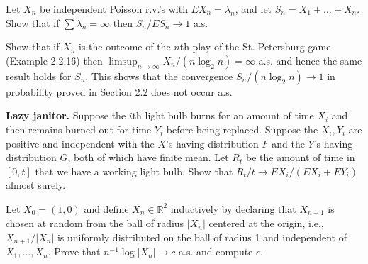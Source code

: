   \begin{exercise}[Durrett 2.3.19]
    Let $X_n$ be independent Poisson r.v.'s with $EX_n = \lambda_n$, and let $S_n = X_1 + \dots + X_n$. Show that if $\sum \lambda_n = \infty$ then $S_n/ES_n \to 1$ a.s.
  \end{exercise}
  \begin{solution}

  \end{solution}

  \begin{exercise}[Durrett 2.3.20]
    Show that if $X_n$ is the outcome of the $n$th play of the St. Petersburg game (Example 2.2.16) then $\limsup_{n \to \infty} X_n / (n \log_2 n) = \infty$ a.s. and hence the same result holds for $S_n$. This shows that the convergence $S_n / (n \log_2 n) \to 1$ in probability proved in Section 2.2 does not occur a.s.
  \end{exercise}
  \begin{solution}

  \end{solution}

  \begin{exercise}[Durrett 2.4.1]
    \textbf{Lazy janitor.} Suppose the $i$th light bulb burns for an amount of time $X_i$ and then remains burned out for time $Y_i$ before being replaced. Suppose the $X_i, Y_i$ are positive and independent with the $X$'s having distribution $F$ and the $Y$'s having distribution $G$, both of which have finite mean. Let $R_t$ be the amount of time in $[0, t]$ that we have a working light bulb. Show that $R_t/t \to EX_i/(EX_i + EY_i)$ almost surely.
  \end{exercise}
  \begin{solution}

  \end{solution}

  \begin{exercise}[Durrett 2.4.2]
    Let $X_0 = (1, 0)$ and define $X_n \in \mathbb{R}^2$ inductively by declaring that $X_{n+1}$ is chosen at random from the ball of radius $|X_n|$ centered at the origin, i.e., $X_{n+1}/|X_n|$ is uniformly distributed on the ball of radius 1 and independent of $X_1, \dots, X_n$. Prove that $n^{-1} \log |X_n| \to c$ a.s. and compute $c$.
  \end{exercise}
  \begin{solution}

  \end{solution}

